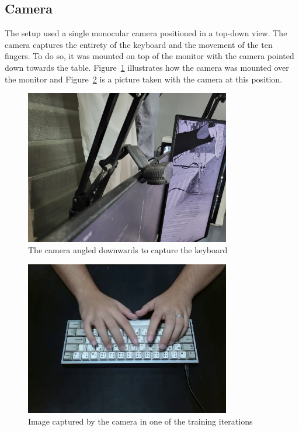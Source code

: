 \documentclass{report}
\begin{document}
\subsection{Camera}
The setup used a single monocular camera positioned in a top-down view. The
camera captures the entirety of the keyboard and the movement of the ten
fingers. To do so, it was mounted on top of the monitor with the camera pointed
down towards the table. Figure~\ref{fig:metho-setup-camera-placement}
illustrates how the camera was mounted over the monitor and
Figure~\ref{fig:metho-setup-keeb} is a picture taken with the camera at this
position.

\begin{figure}[H]
	\centering
	\includegraphics[width=0.8\textwidth]{camera-placement.jpg}
	\caption{The camera angled downwards to capture the keyboard}
	\label{fig:metho-setup-camera-placement}
\end{figure}

\begin{figure}[H]
	\centering
	\includegraphics[width=0.8\textwidth]{actual-keeb.png}
	\caption{Image captured by the camera in one of the training iterations}
	\label{fig:metho-setup-keeb}
\end{figure}
\end{document}

